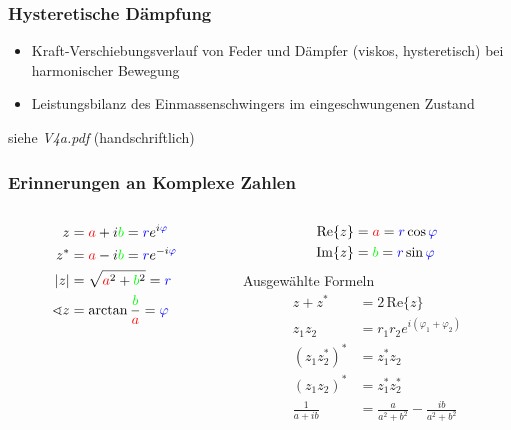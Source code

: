 \begin{frame}
\frametitle{Hysteretische Dämpfung}
        \begin{itemize}
                \item Kraft-Verschiebungsverlauf von Feder und Dämpfer (viskos, hysteretisch) bei harmonischer Bewegung
                \item Leistungsbilanz des Einmassenschwingers im eingeschwungenen Zustand
        \end{itemize}
        \vfill

        \hfill siehe \textsl{V4a.pdf} (handschriftlich)
\end{frame}


\begin{frame}
\frametitle{Erinnerungen an Komplexe Zahlen}
\begin{columns}
        \begin{column}[t]{.3\linewidth}
        
                \begin{align*}
                        z&={\color{red}a}+i{\color{green}b}={\color{blue}r}e^{i{\color{blue}\varphi}}\\
                        z^*&={\color{red}a}-i{\color{green}b}={\color{blue}r}e^{-i{\color{blue}\varphi}}\\
                        |z|&=\sqrt{{\color{red}a}^2+{\color{green}b}^2}={\color{blue}r}\\
                        \sphericalangle z &=\arctan\frac{\color{green}b}{\color{red}a}={\color{blue}\varphi}
                \end{align*}
        \end{column}
        \begin{column}[t]{.7\linewidth}
        \vspace{-3cm}
        \begin{align*}
         \mathrm{Re}\{z\}&={\color{red}a}  ={\color{blue}r}\cos{\color{blue}\varphi}\\
         \mathrm{Im}\{z\}&={\color{green}b}={\color{blue}r}\sin{\color{blue}\varphi}
        \end{align*}
        \hspace{2cm} Ausgewählte Formeln
         \begin{align*}
          z+z^*&=2\,\mathrm{Re}\{z\}\\
          z_1z_2&=r_1r_2 e^{i(\varphi_1+\varphi_2)}\\
          (z_1z_2^*)^*&=z_1^*z_2\\
          (z_1 z_2)^*&=z_1^*z_2^*\\
          \frac{1}{a+ib}&=\frac{a}{a^2+b^2}-\frac{ib}{a^2+b^2}
         \end{align*}
        \end{column}
\end{columns}
\end{frame}


